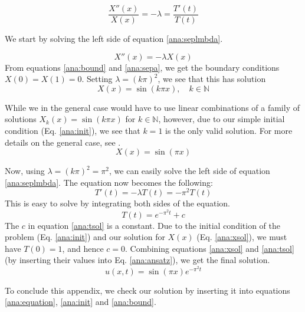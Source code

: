 \begin{equation}
     \frac{X''(x)}{X(x)} = -\lambda = \frac{T'(t)}{T(t)} \label{ana:seplmbda}
\end{equation}

We start by solving the left side of equation \ref{ana:seplmbda}.

\begin{equation*}
    X''(x) = -\lambda X(x)
\end{equation*}
From equations \ref{ana:bound} and \ref{ana:sepa}, we get the boundary conditions 
$X(0) = X(1) = 0$.
Setting $\lambda = (k\pi)^2$, we see that this has solution
\begin{equation*}
    X(x) = \sin(k \pi x) , \quad k \in \mathbb{N}
\end{equation*}

While we in the general case would have to use linear combinations of a family of solutions $X_k(x) = \sin(k \pi x)$ for $k \in \mathbb{N}$, however, due to our simple initial condition (Eq. \ref{ana:init}), we see that $k=1$ is the only valid solution. 
For more details on the general case, see \textcite[p. 92]{tveitoPDE}.
\begin{equation}\label{ana:xsol}
        X(x) = \sin(\pi x)
\end{equation}

Now, using $\lambda = (k\pi)^2 = \pi^2$, we can easily solve the left side of equation \ref{ana:seplmbda}.
The equation now becomes the following:
\begin{equation*}
    T'(t) = -\lambda T(t) = -\pi^2 T(t)
\end{equation*}
This is easy to solve by integrating both sides of the equation.
\begin{equation}\label{ana:tsol}
    T(t) = e^{-\pi^2 t} + c
\end{equation}
The $c$ in equation \ref{ana:tsol} is a constant.
Due to the initial condition of the problem (Eq. \ref{ana:init}) and our solution for $X(x)$ (Eq. \ref{ana:xsol}), we must have $T(0) = 1$, and hence $c = 0$.
Combining equations \ref{ana:xsol} and \ref{ana:tsol} (by inserting their values into Eq. \ref{ana:ansatz}), we get the final solution.
\begin{equation}
    u(x,t) = \sin(\pi x) e^{-\pi^2 t}
\end{equation}

To conclude this appendix, we check our solution by inserting it into equations \ref{ana:equation}, \ref{ana:init} and \ref{ana:bound}.

